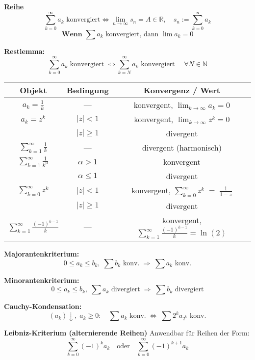 \textbf{Reihe }
\[
\sum_{k=0}^\infty a_k \text{ konvergiert} \Leftrightarrow 
\lim_{n \to \infty} s_n = A \in \mathbb{R},\quad s_n := \sum_{k=0}^n a_k
\]
\[
\textbf{Wenn } \sum a_k \text{ konvergiert, dann } \lim a_k = 0
\]

\textbf{Restlemma:}  
\[
\sum_{k=0}^\infty a_k \text{ konvergiert } \Leftrightarrow  
\sum_{k=N}^\infty a_k \text{ konvergiert } \quad \forall N \in \mathbb{N}
\]
\footnotesize
\begin{tabular}{|c|c|c|}
\hline
\textbf{Objekt} & \textbf{Bedingung} & \textbf{Konvergenz / Wert} \\
\hline
$a_k = \frac{1}{k}$ 
  & — 
  & konvergent, $\displaystyle\lim_{k\to\infty}a_k = 0$ \\
\hline
$a_k = z^k$ 
  & $|z|<1$ 
  & konvergent, $\displaystyle\lim_{k\to\infty}z^k = 0$ \\
  & $|z|\ge1$ 
  & divergent \\
\hline
$\displaystyle \sum_{k=1}^\infty \frac{1}{k}$ 
  & — 
  & divergent (harmonisch) \\
\hline
$\displaystyle \sum_{k=1}^\infty \frac{1}{k^\alpha}$ 
  & $\alpha > 1$ 
  & konvergent \\
  & $\alpha \le 1$ 
  & divergent \\
\hline
$\displaystyle \sum_{k=0}^\infty z^k$ 
  & $|z|<1$ 
  & konvergent, $\displaystyle\sum_{k=0}^\infty z^k \;=\;\frac{1}{1-z}$ \\
  & $|z|\ge1$ 
  & divergent \\
\hline
$\displaystyle \sum_{k=1}^\infty \frac{(-1)^{k-1}}{k}$ 
  & — 
  & konvergent, $\displaystyle\sum_{k=1}^\infty \frac{(-1)^{k-1}}{k} = \ln(2)$ \\
\hline
\end{tabular}



\textbf{Majorantenkriterium:}  
\[
0 \leq a_k \leq b_k,\; \sum b_k \text{ konv.} \;\Rightarrow\; \sum a_k \text{ konv.}
\]

\textbf{Minorantenkriterium:}  
\[
0 \leq a_k \leq b_k,\; \sum a_k \text{ divergiert} \;\Rightarrow\; \sum b_k \text{ divergiert}
\]

\textbf{Cauchy-Kondensation:}  
\[
(a_k) \downarrow,\; a_k \geq 0:  
\quad \sum a_k \text{ konv.} \;\Leftrightarrow\; \sum 2^k a_{2^k} \text{ konv.}
\]

\textbf{Leibniz-Kriterium (alternierende Reihen)}  
Anwendbar für Reihen der Form:
\[
\sum_{k=0}^\infty (-1)^k a_k \quad \text{oder} \quad \sum_{k=0}^\infty (-1)^{k+1} a_k
\]

